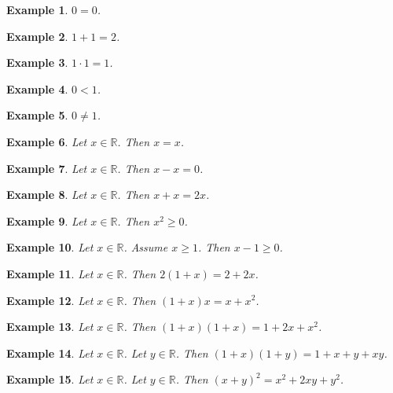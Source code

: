 \documentclass{article}
\newtheorem{example}{Example}
\begin{document}
\begin{example}
$0=0$.
\end{example}

\begin{example}
$1+1=2$.
\end{example}

\begin{example}
$1\cdot 1=1$.
\end{example}

\begin{example}
$0<1$.
\end{example}

\begin{example}
$0\ne 1$.
\end{example}

\begin{example}
Let $x\in\mathbb{R}$. Then $x=x$.
\end{example}

\begin{example}
Let $x\in\mathbb{R}$. Then $x-x=0$.
\end{example}

\begin{example}
Let $x\in\mathbb{R}$. Then $x+x=2x$.
\end{example}

\begin{example}
Let $x\in\mathbb{R}$. Then $x^2\geq 0$.
\end{example}

\begin{example}
Let $x\in\mathbb{R}$. Assume $x\geq 1$. Then $x-1\geq 0$.
\end{example}

\begin{example}
Let $x\in\mathbb{R}$. Then $2(1+x)=2+2x$.
\end{example}

\begin{example}
Let $x\in\mathbb{R}$. Then $(1+x)x=x+x^2$.
\end{example}

\begin{example}
Let $x\in\mathbb{R}$. Then $(1+x)(1+x)=1+2x+x^2$.
\end{example}

\begin{example}
Let $x\in\mathbb{R}$. Let $y\in\mathbb{R}$. Then $(1+x)(1+y)=1+x+y+xy$.
\end{example}

\begin{example}
Let $x\in\mathbb{R}$. Let $y\in\mathbb{R}$. Then ${(x+y)}^2=x^2+2xy+y^2$.
\end{example}
\end{document}
